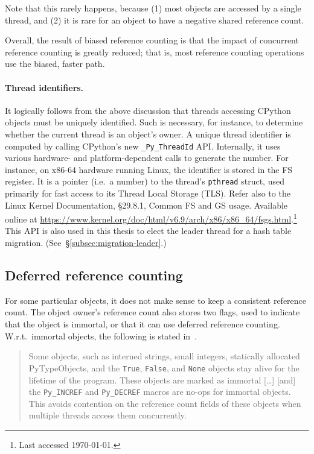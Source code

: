 Note that this rarely happens, because (1) most objects are accessed by a single thread, and (2) it is rare for an object to have a negative shared reference count.

Overall, the result of biased reference counting is that the impact of concurrent reference counting is greatly reduced; that is, most reference counting operations use the biased, faster path.


\paragraph{Thread identifiers.}
It logically follows from the above discussion that threads accessing CPython objects must be uniquely identified.
Such is necessary, for instance, to determine whether the current thread is an object's owner.
A unique thread identifier is computed by calling CPython's new \texttt{\_Py\_ThreadId} API\@.
Internally, it uses various hardware- and platform-dependent calls to generate the number.
For instance, on x86-64 hardware running Linux, the identifier is stored in the FS register.
It is a pointer (i.e.\ a number) to the thread's \texttt{pthread} struct, used primarily for fast access to its Thread Local Storage (TLS).
Refer also to the Linux Kernel Documentation, \S29.8.1, Common FS and GS usage.
Available online at \url{https://www.kernel.org/doc/html/v6.9/arch/x86/x86_64/fsgs.html}.\footnote{Last accessed \today.}
This API is also used in this thesis to elect the leader thread for a hash table migration.
(See~\S\ref{subsec:migration-leader}.)


\subsection{Deferred reference counting}\label{subsec:deferred-reference-counting}

For some particular objects, it does not make sense to keep a consistent reference count.
The object owner's reference count also stores two flags, used to indicate that the object is immortal, or that it can use deferred reference counting.
W.r.t.\ immortal objects, the following is stated in~\cite[\S Immortalization]{pep703}.
\begin{quote}
    Some objects, such as interned strings, small integers, statically allocated PyTypeObjects, and the \texttt{True}, \texttt{False}, and \texttt{None} objects stay alive for the lifetime of the program.
    These objects are marked as immortal [\ldots] [and] the \texttt{{Py\_INCREF}} and \texttt{{Py\_DECREF}} macros are no-ops for immortal objects.
    This avoids contention on the reference count fields of these objects when multiple threads access them concurrently.
\end{quote}

